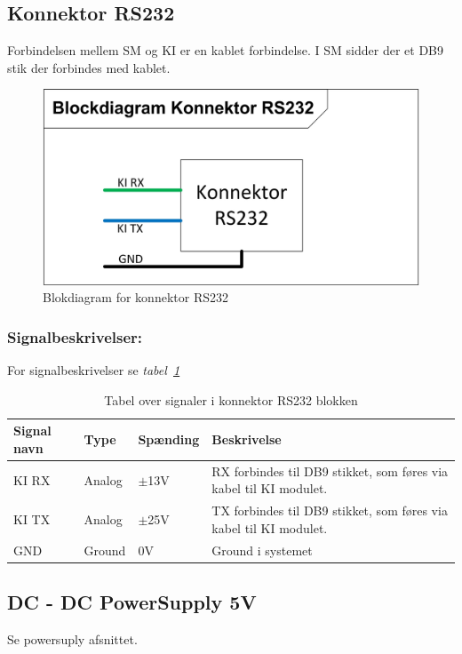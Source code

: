 \subsection{Konnektor RS232}
Forbindelsen mellem SM og KI er en kablet forbindelse. I SM sidder der et DB9 stik der forbindes med kablet.
\begin{figure}[H]
\centering
\includegraphics[scale=1]{billeder/konnektor_rs232}
\caption{Blokdiagram for konnektor RS232}
\label{fig:KonnektorRS232}
\end{figure}
\subsubsection{Signalbeskrivelser:}
For signalbeskrivelser se \textit{tabel~\ref{table:konnektorRS232}}
\begin{table}[H]
\begin{tabular}{|p{3cm}|p{3cm}|p{3cm}|p{4.5cm}|} \hline
\cellcolor[gray]{0.85}Signal navn& \cellcolor[gray]{0.85}Type &\cellcolor[gray]{0.85}Spænding&\cellcolor[gray]{0.85}Beskrivelse\\ \hline
KI RX & Analog & $\pm$13V & RX forbindes til DB9 stikket, som føres via kabel til KI modulet.\\ \hline
KI TX & Analog & $\pm$25V & TX forbindes til DB9 stikket, som føres via kabel til KI modulet. \\ \hline
GND & Ground & 0V & Ground i systemet \\ \hline
\end{tabular}
\caption{Tabel over signaler i konnektor RS232 blokken}
\label{table:konnektorRS232}
\end{table}
\subsection{DC - DC PowerSupply 5V}
Se powersuply afsnittet.
\newpage
